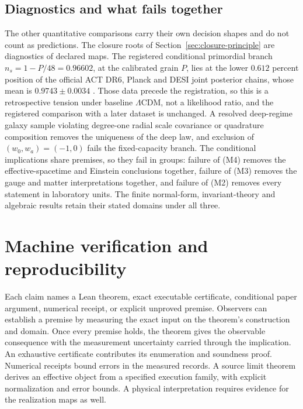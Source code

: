 \documentclass[11pt]{article}
\theoremstyle{definition}
\theoremstyle{remark}
\begin{document}
\subsection{Diagnostics and what fails together}

The other quantitative comparisons carry their own decision shapes and do not
count as predictions. The closure roots of
Section~\ref{sec:closure-principle} are diagnostics of declared maps. The
registered conditional primordial branch $n_s=1-P/48=0.96602$, at the
calibrated grain $P$, lies at the lower $0.612$ percent position of the
official ACT DR6, Planck and DESI joint posterior chains, whose mean is
$0.9743\pm0.0034$ \cite{act2025,ophpublicdata}. Those data precede the
registration, so this is a retrospective tension under baseline
$\Lambda$CDM, not a likelihood ratio, and the registered comparison with a
later dataset is unchanged. A resolved deep-regime galaxy sample violating
degree-one radial scale covariance or quadrature composition removes the
uniqueness of the deep law, and exclusion of $(w_0,w_a)=(-1,0)$ fails the
fixed-capacity branch. The conditional implications share premises, so they
fail in groups: failure of (M4) removes the effective-spacetime and Einstein
conclusions together, failure of (M3) removes the gauge and matter
interpretations together, and failure of (M2) removes every statement in
laboratory units. The finite normal-form, invariant-theory and algebraic
results retain their stated domains under all three.

\section{Machine verification and reproducibility}
\label{sec:verification}

Each claim names a Lean theorem, exact executable certificate,
conditional paper argument, numerical receipt, or explicit unproved premise.
Observers can establish a premise by measuring the exact input on the
theorem's construction and domain. Once every premise holds, the theorem
gives the observable consequence with the measurement uncertainty carried
through the implication. An exhaustive certificate contributes its enumeration and
soundness proof. Numerical receipts bound errors in the measured records.
A source limit theorem derives an effective object from a specified
execution family, with explicit normalization and error bounds. A physical
interpretation requires evidence for the realization maps as well.
\end{document}
